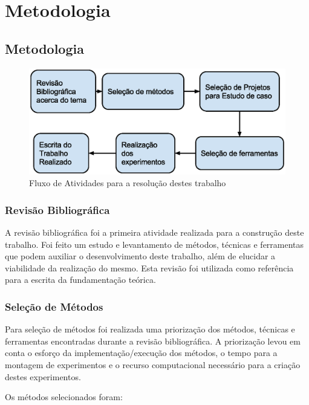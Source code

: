 \part{Metodologia}

\chapter[Metodologia]{Metodologia}

\begin{figure}[h]
    \centering
    \label{fig01}
        \includegraphics[keepaspectratio=true,scale=0.5]{figuras/fases_metodologia.eps}
    \caption{Fluxo de Atividades para a resolução destes trabalho}
\end{figure}

\section{Revisão Bibliográfica}

A revisão bibliográfica foi a primeira atividade realizada para a construção
 deste trabalho. Foi feito um estudo e levantamento de métodos, técnicas e
 ferramentas que podem auxiliar o desenvolvimento deste trabalho, além de
 elucidar a viabilidade da realização do mesmo. Esta revisão foi utilizada
 como referência para a  escrita da fundamentação teórica.

\section{Seleção de Métodos}

Para seleção de métodos foi realizada uma priorização dos métodos, técnicas e
 ferramentas encontradas durante a revisão bibliográfica. A priorização levou
 em conta o esforço da implementação/execução dos métodos, o tempo para a montagem
 de experimentos e o recurso computacional necessário para a criação destes
 experimentos.


Os métodos selecionados foram:

